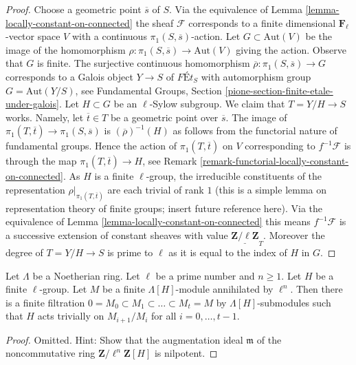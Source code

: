 \begin{proof}
Choose a geometric point $\overline{s}$ of $S$.
Via the equivalence of Lemma \ref{lemma-locally-constant-on-connected}
the sheaf $\mathcal{F}$ corresponds to a finite dimensional
$\mathbf{F}_\ell$-vector space $V$ with a continuous
$\pi_1(S, \overline{s})$-action.
Let $G \subset \text{Aut}(V)$ be the image of the homomorphism
$\rho : \pi_1(S, \overline{s}) \to \text{Aut}(V)$ giving the action.
Observe that $G$ is finite.
The surjective continuous homomorphism
$\overline{\rho} : \pi_1(S, \overline{s}) \to G$
corresponds to a Galois object $Y \to S$ of
$\textit{F\'Et}_S$ with automorphism group $G = \text{Aut}(Y/S)$, see
Fundamental Groups, Section \ref{pione-section-finite-etale-under-galois}.
Let $H \subset G$ be an $\ell$-Sylow subgroup.
We claim that $T = Y/H \to S$ works. Namely, let $\overline{t} \in T$
be a geometric point over $\overline{s}$. The image of
$\pi_1(T, \overline{t}) \to \pi_1(S, \overline{s})$
is $(\overline{\rho})^{-1}(H)$ as follows from the functorial
nature of fundamental groups. Hence the action of $\pi_1(T, \overline{t})$
on $V$ corresponding to $f^{-1}\mathcal{F}$ is through
the map $\pi_1(T, \overline{t}) \to H$, see
Remark \ref{remark-functorial-locally-constant-on-connected}. As
$H$ is a finite $\ell$-group, the irreducible constituents of the
representation $\rho|_{\pi_1(T, \overline{t})}$
are each trivial of rank $1$ (this is a simple lemma on
representation theory of finite groups; insert future reference here).
Via the equivalence of
Lemma \ref{lemma-locally-constant-on-connected}
this means $f^{-1}\mathcal{F}$ is a successive extension of
constant sheaves with value $\underline{\mathbf{Z}/\ell\mathbf{Z}}_T$.
Moreover the degree of $T = Y/H \to S$ is prime to $\ell$
as it is equal to the index of $H$ in $G$.
\end{proof}

\begin{lemma}
\label{lemma-action-l-group}
Let $\Lambda$ be a Noetherian ring.
Let $\ell$ be a prime number and $n \geq 1$.
Let $H$ be a finite $\ell$-group.
Let $M$ be a finite $\Lambda[H]$-module annihilated by $\ell^n$.
Then there is a finite filtration
$0 = M_0 \subset M_1 \subset \ldots \subset M_t = M$
by $\Lambda[H]$-submodules
such that $H$ acts trivially on $M_{i + 1}/M_i$ for all
$i = 0, \ldots, t - 1$.
\end{lemma}

\begin{proof}
Omitted. Hint: Show that the augmentation ideal $\mathfrak m$
of the noncommutative ring $\mathbf{Z}/\ell^n\mathbf{Z}[H]$
is nilpotent.
\end{proof}

